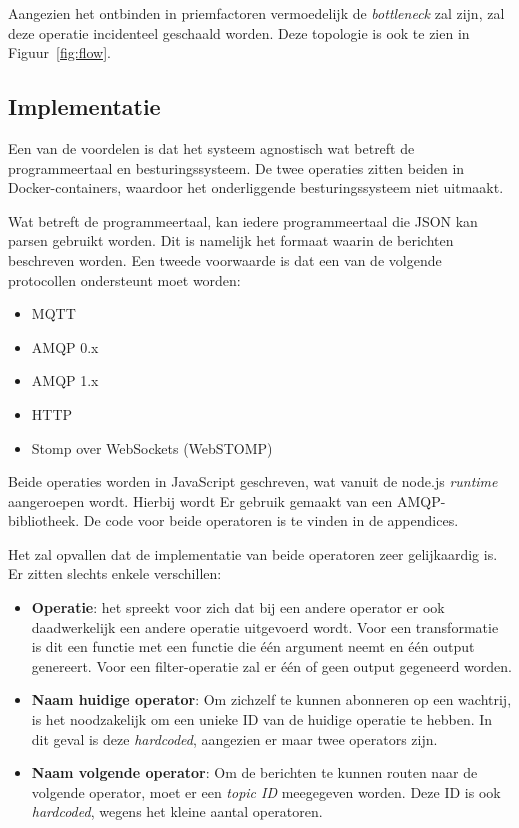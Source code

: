 \documentclass[twocolumn, a4paper]{article}
\begin{document}
Aangezien het ontbinden in priemfactoren vermoedelijk  de \emph{bottleneck} zal zijn, zal deze operatie incidenteel geschaald worden. Deze topologie is ook te zien in Figuur~\ref{fig:flow}.

\subsection{Implementatie}
Een van de voordelen is dat het systeem agnostisch wat betreft de programmeertaal en besturingssysteem. De twee operaties zitten beiden in Docker-containers, waardoor het onderliggende besturingssysteem niet uitmaakt. 

Wat betreft de programmeertaal, kan iedere programmeertaal die JSON kan parsen gebruikt worden. Dit is namelijk het formaat waarin de berichten beschreven worden. Een tweede voorwaarde is dat een van de volgende protocollen ondersteunt moet worden:
\begin{itemize}
    \item MQTT
    \item AMQP 0.x
    \item AMQP 1.x
    \item HTTP
    \item Stomp over WebSockets (WebSTOMP)
\end{itemize}

Beide operaties worden in JavaScript geschreven, wat vanuit de node.js \emph{runtime} aangeroepen wordt. Hierbij wordt Er gebruik gemaakt van een AMQP-bibliotheek. De code voor beide operatoren is te vinden in de appendices. 

Het zal opvallen dat de implementatie van beide operatoren zeer gelijkaardig is. Er zitten slechts enkele verschillen:

\begin{itemize}
    \item \textbf{Operatie}: het spreekt voor zich dat bij een andere operator er ook daadwerkelijk een andere operatie uitgevoerd wordt. Voor een transformatie is dit een functie met een functie die één argument neemt en één output genereert. Voor een filter-operatie zal er één of geen output gegeneerd worden.
    \item \textbf{Naam huidige operator}: Om zichzelf te kunnen abonneren op een wachtrij, is het noodzakelijk om een unieke ID van de huidige operatie te hebben. In dit geval is deze \emph{hardcoded}, aangezien er maar twee operators zijn.
    \item \textbf{Naam volgende operator}: Om de berichten te kunnen routen naar de volgende operator, moet er een \emph{topic ID} meegegeven worden. Deze ID is ook \emph{hardcoded}, wegens het kleine aantal operatoren. 
\end{itemize}
\end{document}
